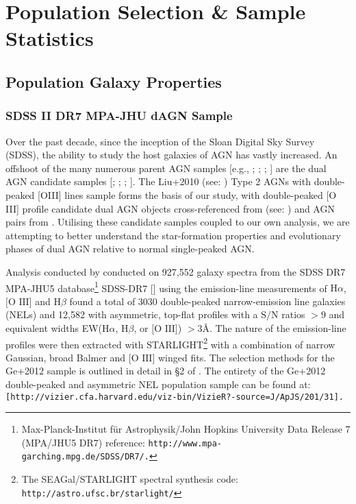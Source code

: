 \section{Population Selection \& Sample Statistics}
\subsection{Population Galaxy Properties}
\subsubsection{SDSS II DR7 MPA-JHU dAGN Sample}

Over the past decade, since the inception of the Sloan Digital Sky Survey (SDSS), the ability to study the host galaxies of AGN has vastly increased. An offshoot of the many numerous parent AGN samples [e.g., \cite{Zakamska2003}; \cite{Kewley_2006}; \cite{Stasinska_2006}; \cite{Wild_2010}] are the dual AGN candidate samples [\cite{Smith_2010}; \cite{Liu_2012}; \cite{Ge_Hu_Wang_Bai_Zhang_2012}; \cite{2012ApJ...753...42C}]. The Liu+2010 (see: \cite{Liu_2009}) Type 2 AGNs with double-peaked [OIII] lines sample forms the basis of our study, with double-peaked [O III] profile candidate dual AGN objects cross-referenced from (see: \cite{Ge_Hu_Wang_Bai_Zhang_2012}) and AGN pairs from \cite{Liu_2012}. Utilising these candidate samples coupled to our own analysis, we are attempting to better understand the star-formation properties and evolutionary phases of dual AGN relative to normal single-peaked AGN. 

Analysis conducted by \cite{Ge_Hu_Wang_Bai_Zhang_2012} conducted on 927,552 galaxy spectra from the SDSS DR7 MPA-JHU5 database\footnote{\tiny{Max-Planck-Institut für Astrophysik/John Hopkins University Data Release 7 (MPA/JHU5 DR7) reference: \tt{http://www.mpa-garching.mpg.de/SDSS/DR7/}.}} SDSS-DR7 [\cite{2009ApJS..182..543A}] using the emission-line measurements of $\text{H}\alpha$, $\text{[O III]}$ and $\text{H}\beta$ found a total of 3030 double-peaked narrow-emission line galaxies (NELs) and 12,582 with asymmetric, top-ﬂat proﬁles with a $\text{S/N}$ ratios ${>}{9}$ and equivalent widths EW($\text{H}\alpha$, $\text{H}\beta$, or $\text{[O III]}$) ${>}{3}Å$. The nature of the emission-line profiles were then extracted with STARLIGHT\footnote{\tiny{The SEAGal/STARLIGHT spectral synthesis code: \tt{http://astro.ufsc.br/starlight/}}} with a combination of narrow Gaussian, broad Balmer and $\text{[O III]}$ winged fits. The selection methods for the Ge+2012 sample is outlined in detail in §2 of \cite{Ge_Hu_Wang_Bai_Zhang_2012}. The entirety of the Ge+2012 double-peaked and asymmetric NEL population sample can be found at: \tt{[http://vizier.cfa.harvard.edu/viz-bin/VizieR?-source=J/ApJS/201/31]}.

